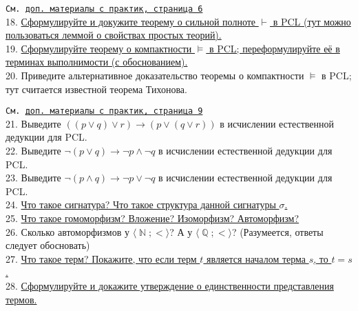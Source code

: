 \documentclass[a4paper,100pt]{article}
\theoremstyle{indented}
\theoremstyle{definition}
\theoremstyle{remark}
\DeclareMathOperator{\ra}{\rightarrow}
\DeclareMathOperator{\NN}{\mathbb{N}}
\DeclareMathOperator{\QQ}{\mathbb{Q}}
\begin{document}
\texttt{См. \href{http://www.mi-ras.ru/~speranski/courses/logic-1-2021-spring/slides-more_pcl.pdf}{доп. материалы с практик, страница 6}} \\

18. \hyperlink{b18}{Сформулируйте и докужите теорему о сильной полноте $\vdash$ в PCL (тут можно пользоваться леммой о свойствах простых теорий).} \\

19. \hyperlink{b19}{Сформулируйте теорему о компактности $\vDash$ в PCL; переформулируйте её в терминах выполнимости (с обоснованием).} \\ 

20. %
{Приведите альтернативное доказательство теоремы о компактности $\vDash$ в PCL; тут считается известной теорема Тихонова.} \ 

\texttt{См. \href{http://www.mi-ras.ru/~speranski/courses/logic-1-2021-spring/slides-more_pcl.pdf}{доп. материалы с практик, страница 9}} \\ 

21. %
{Выведите $((p \vee q) \vee r) \ra (p \vee (q \vee r))$ в исчислении естественной дедукции для PCL.} \\ 

22. %
{Выведите $\neg(p \vee q)\ra \neg p \wedge \neg q$ в исчислении естественной дедукции для PCL.} \\ 

23. %
{Выведите $\neg(p \wedge q)\ra \neg p \vee \neg q$ в исчислении естественной дедукции для PCL.} \\ 

24. \hyperlink{b24}{Что такое сигнатура? Что такое структура данной сигнатуры $\sigma$.} \\ 

25. \hyperlink{b25}{Что такое гомоморфизм? Вложение? Изоморфизм? Автоморфизм?} \\

26. %
{Сколько автоморфизмов у $\langle \NN; < \rangle$? А у $\langle \QQ; <\rangle$? (Разумеется, ответы следует обосновать)} \\

27. \hyperlink{b27}{Что такое терм? Покажите, что если терм $t$ является началом терма $s$, то $t=s$.} \\ 

28. \hyperlink{b28}{Сформулируйте и докажите утверждение о единственности представления термов.} \\ 
\end{document}
